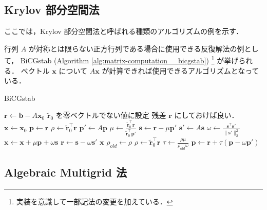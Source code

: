 \clearpage

\subsection{Krylov 部分空間法}

ここでは，Krylov 部分空間法と呼ばれる種類のアルゴリズムの例を示す．


行列 $A$ が対称とは限らない正方行列である場合に使用できる反復解法の例として，
BiCGstab (Algorithm \ref{alg:matrix-computation__bicgstab})
\footnote{実装を意識して一部記法の変更を加えている．}
が挙げられる．
ベクトル $\bm{x}$ について $A \bm{x}$ が計算できれば使用できるアルゴリズムとなっている．

\begin{algorithm}[tp]
    \caption{BiCGstab \cite{Golub2013}}
    \label{alg:matrix-computation__bicgstab}
    \begin{algorithmic}
        \State $\bm{r} \gets \bm{b} - A \bm{x}_0$
        \State $\tilde{\bm{r}}_0$ を零ベクトルでない値に設定
        \Comment 残差 $\bm{r}$ にしておけば良い．
        \State $\bm{x} \gets \bm{x}_0$
        \State $\bm{p} \gets \bm{r}$
        \State $\rho \gets \tilde{\bm{r}}_0^\top \bm{r}$
        \Loop
        \State $\bm{p}' \gets A \bm{p}$
        \State $\mu \gets \frac{\tilde{\bm{r}}_0^\top \bm{r}}{\tilde{\bm{r}}_0^\top \bm{p}'}$
        \State $\bm{s} \gets \bm{r} - \mu \bm{p}'$
        \State $\bm{s}' \gets A \bm{s}$
        \State $\omega \gets \frac{\bm{s}^\top \bm{s}'}{\|\bm{s}'\|_2^2}$
        \State $\bm{x} \gets \bm{x} + \mu \bm{p} + \omega \bm{s}$
        \State $\bm{r} \gets \bm{s} - \omega \bm{s}'$
        \State \Return $\bm{x}$
        \EndIf
        \State $\rho_{old} \gets \rho$
        \State $\rho \gets \tilde{\bm{r}}_0^\top \bm{r}$
        \State $\tau \gets \frac{\rho \mu}{\rho_{old} \omega}$
        \State $\bm{p} \gets \bm{r} + \tau(\bm{p} - \omega \bm{p}')$
        \EndLoop
        \EndProcedure
    \end{algorithmic}
\end{algorithm}

\subsection{Algebraic Multigrid 法}

